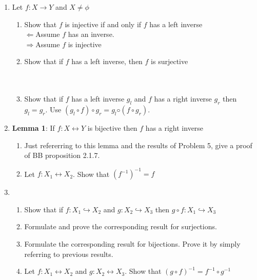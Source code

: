 \documentclass[11pt]{article}
\begin{document}
\begin{enumerate}
\item Let $f:X \to Y$ and $X \neq \phi$
\begin{enumerate}
\item Show that $f$ is injective if and only if $f$ has a left inverse\\
$\Leftarrow$Assume $f$ has an inverse.\\

$\Rightarrow$Assume $f$ is injective\\
\item Show that if $f$ has a left inverse, then $f$ is surjective\\\\
\\
\item Show that if $f$ has a left inverse $g_l$ and $f$ has a right inverse
$g_r$ then $g_l = g_r$. Use $(g_l \circ f) \circ g_r = g_l ◦ (f \circ g_r )$.
\end{enumerate} %

\newpage
\item \textbf{Lemma 1}: If $f:X \leftrightarrow Y$ is bijective then $f$ has a right inverse
\begin{enumerate}
\item Just refererring to this lemma and the results of Problem 5, give a proof of BB proposition 2.1.7.\\
\item Let $f: X_1 \leftrightarrow X_2$.  Show that $(f^{-1})^{-1} = f$
\end{enumerate}

\newpage
\item
\begin{enumerate}
\item Show that if $f :X_1 \hookrightarrow X_2$ and $g :X_2 \hookrightarrow X_3$ then $g \circ f: X_1 \hookrightarrow X_3$\\
\item Formulate and prove the corresponding result for surjections.\\
\item Formulate the corresponding result for bijections. Prove it by simply referring to previous results.
\item Let $f :X_1 \leftrightarrow X_2$ and $g :X_2 \leftrightarrow X_3$.  Show that $(g \circ f)^{-1} = f^{-1} \circ g^{-1}$\\
\end{enumerate}



\end{enumerate}
\end{document}
